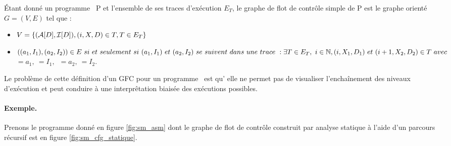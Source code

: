 \begin{defi}
 Étant donné un programme \sm\ P et l'ensemble de ses traces d'exécution
$E_T$, le graphe de flot de contrôle simple de P est le graphe orienté
$G=(V, E)$ tel que :
 \begin{itemize}
  \item $V=\{(\mathcal A[D], \mathcal I[D]), (i, X, D)\in T, T\in E_T\}$
  \item $((a_1, I_1), (a_2, I_2))\in E\ si\ et\ seulement\ si\ (a_1,
I_1)\ et\ (a_2, I_2)\ se\ suivent\ dans\ une\ trace\ : \exists T\in
E_T,\ i\in \BN, (i, X_1, D_1)\ et\ (i+1, X_2, D_2)\in T\ avec\
$$=a_1,\ $$=I_1,$~$=a_2,\ $$=I_2$.
 \end{itemize}
\label{def:cfg_naif_sm}
\end{defi}

Le problème de cette définition d'un GFC pour un programme \sm\ est qu'%
elle ne permet pas de visualiser l'enchaînement des niveaux d'exécution et peut conduire à une interprêtation biaisée des exécutions possibles.

\paragraph{Exemple.}
Prenons le programme donné en figure \ref{fig:sm_asm} dont le graphe de flot de contrôle construit par analyse statique à l'aide d'un parcours récursif est en figure \ref{fig:sm_cfg_statique}.

